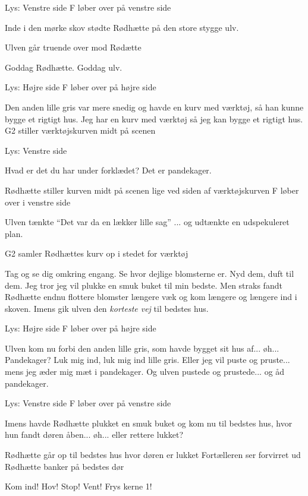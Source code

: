 \documentclass[a4paper,11pt]{article}
\begin{document}
\begin{sketch}
\scene Lys: Venstre side
\scene F løber over på venstre side

 Inde i den mørke skov stødte Rødhætte på den store stygge ulv.

\scene Ulven går truende over mod Rødætte

 Goddag Rødhætte.
 Goddag ulv.

\scene Lys: Højre side
\scene F løber over på højre side

 Den anden lille gris var mere snedig og havde en kurv med værktøj, så han kunne bygge et rigtigt hus.
 Jeg har en kurv med værktøj så jeg kan bygge et rigtigt hus.
\scene G2 stiller værktøjskurven midt på scenen

\scene Lys: Venstre side

 Hvad er det du har under forklædet?
 Det er pandekager.

\scene Rødhætte stiller kurven midt på scenen lige ved siden af værktøjskurven
\scene F løber over i venstre side

 Ulven tænkte
 ``Det var da en lækker lille sag''
 ... og udtænkte en udspekuleret plan.

\scene G2 samler Rødhættes kurv op i stedet for værktøj

 Tag og se dig omkring engang. Se hvor dejlige blomsterne er. Nyd dem, duft til dem.
 Jeg tror jeg vil plukke en smuk buket til min bedste.
 Men straks fandt Rødhætte endnu flottere blomster længere væk og kom længere og længere ind i skoven.
 Imens gik ulven den \emph{korteste vej} til bedstes hus.

\scene Lys: Højre side
\scene F løber over på højre side

 Ulven kom nu forbi den anden lille gris, som havde bygget sit hus af... øh... Pandekager?
 Luk mig ind, luk mig ind lille gris. Eller jeg vil puste og pruste... mens jeg æder mig mæt i pandekager.
 Og ulven pustede og prustede... og åd pandekager.

\scene Lys: Venstre side
\scene F løber over på venstre side

 Imens havde Rødhætte plukket en smuk buket og kom nu til bedstes hus, hvor hun fandt døren åben... øh... eller rettere lukket?

\scene Rødhætte går op til bedstes hus hvor døren er lukket
\scene Fortælleren ser forvirret ud
\scene Rødhætte banker på bedstes dør

 Kom ind!
 Hov! Stop! Vent! Frys kerne 1!


\end{sketch}
\end{document}
